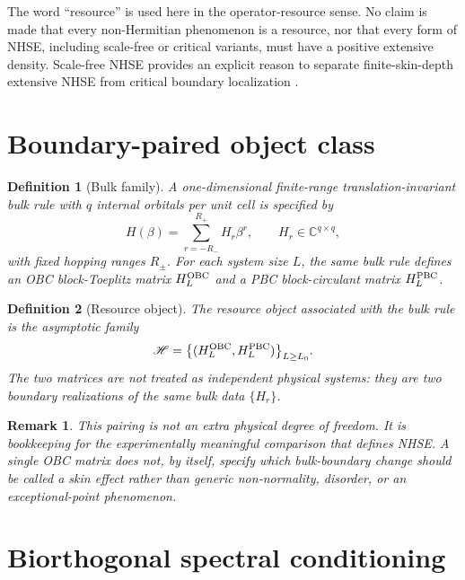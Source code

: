 \documentclass[reprint,amsmath,amssymb,aps,nofootinbib]{revtex4-2}
\newtheorem{definition}{Definition}
\newtheorem{remark}{Remark}
\begin{document}
The word ``resource'' is used here in the operator-resource sense. No claim is
made that every non-Hermitian phenomenon is a resource, nor that every form of
NHSE, including scale-free or critical variants, must have a positive
extensive density. Scale-free NHSE provides an explicit reason to separate
finite-skin-depth extensive NHSE from critical boundary localization
\cite{LiSunYangLi}.

\section{Boundary-paired object class}
\label{sec:objects}

\begin{definition}[Bulk family]
A one-dimensional finite-range translation-invariant bulk rule with \(q\)
internal orbitals per unit cell is specified by
\begin{equation}
H(\beta)=\sum_{r=-R_-}^{R_+}H_r\beta^r,
\qquad H_r\in\mathbb C^{q\times q},
\end{equation}
with fixed hopping ranges \(R_\pm\). For each system size \(L\), the same
bulk rule defines an OBC block-Toeplitz matrix \(H_L^{\rm OBC}\) and a PBC
block-circulant matrix \(H_L^{\rm PBC}\).
\end{definition}

\begin{definition}[Resource object]
The resource object associated with the bulk rule is the asymptotic family
\begin{equation}
\mathscr H=\big\{(H_L^{\rm OBC},H_L^{\rm PBC})\big\}_{L\ge L_0}.
\end{equation}
The two matrices are not treated as independent physical systems: they are
two boundary realizations of the same bulk data \(\{H_r\}\).
\end{definition}

\begin{remark}
This pairing is not an extra physical degree of freedom. It is bookkeeping
for the experimentally meaningful comparison that defines NHSE. A single
OBC matrix does not, by itself, specify which bulk-boundary change should be
called a skin effect rather than generic non-normality, disorder, or an
exceptional-point phenomenon.
\end{remark}

\section{Biorthogonal spectral conditioning}
\label{sec:conditioning}
\end{document}
